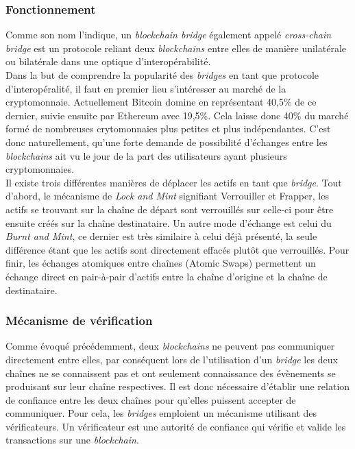 
\subsubsection{Fonctionnement}

Comme son nom l’indique, un \textit{\gls{blockchain} bridge} également appelé \textit{\gls{cross-chain} bridge} est un protocole reliant deux \textit{\gls{blockchain}s} entre elles de manière unilatérale ou bilatérale dans une optique d’interopérabilité.\\

Dans la but de comprendre la popularité des \textit{bridges} en tant que protocole d’interopéralité, il faut en premier lieu s’intéresser au marché de la cryptomonnaie. Actuellement Bitcoin domine en représentant 40,5\% de ce dernier, suivie ensuite par Ethereum avec 19,5\%. Cela laisse donc 40\% du marché formé de nombreuses crytomonnaies plus petites et plus indépendantes. C’est donc naturellement, qu’une forte demande de possibilité d’échanges entre les \textit{\gls{blockchain}s} ait vu le jour de la part des utilisateurs ayant plusieurs cryptomonnaies\cite{NgraveNumbers}.\\

Il existe trois différentes manières de déplacer les \gls{actif}s en tant que \textit{bridge}. Tout d’abord, le mécanisme de \textit{Lock and Mint} signifiant Verrouiller et Frapper, les \gls{actif}s se trouvant sur la chaîne de départ sont verrouillés sur celle-ci pour être ensuite créés sur la chaîne destinataire. Un autre mode d'échange est celui du \textit{Burnt and Mint}, ce dernier est très similaire à celui déjà présenté, la seule différence étant que les \gls{actif}s sont directement effacés plutôt que verrouillés. Pour finir, les échanges atomiques entre chaînes (Atomic Swaps) permettent un échange direct en pair-à-pair d'\gls{actif}s entre la chaîne d’origine et la chaîne de destinataire.\cite{EthereumMechanism}

\subsubsection{Mécanisme de vérification}

Comme évoqué précédemment, deux \textit{\gls{blockchain}s} ne peuvent pas communiquer directement entre elles, par conséquent lors de l’utilisation d’un \textit{bridge} les deux chaînes ne se connaissent pas et ont seulement connaissance des évènements se produisant sur leur chaîne respectives. Il est donc nécessaire d’établir une relation de confiance entre les deux chaînes pour qu’elles puissent accepter de communiquer. Pour cela, les \textit{bridges} emploient un mécanisme utilisant des vérificateurs. Un vérificateur est une autorité de confiance qui vérifie et valide les transactions sur une \textit{\gls{blockchain}}. \\


